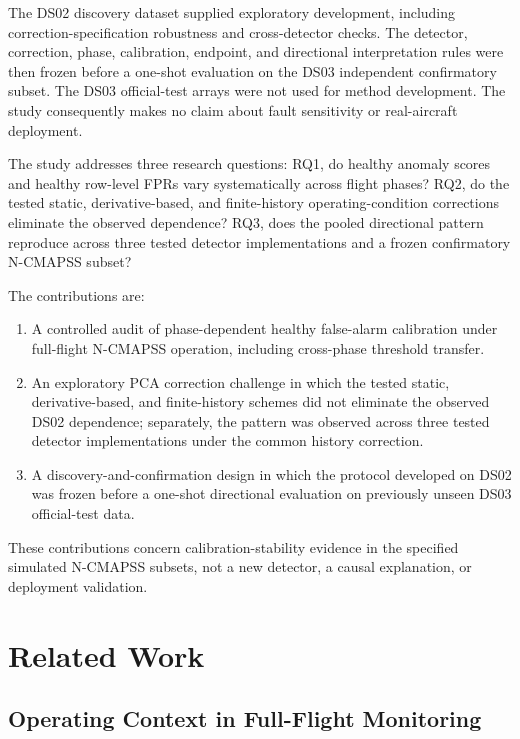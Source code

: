 \documentclass[preprint,12pt]{elsarticle}
\providecommand{\tightlist}{}
\begin{document}
The DS02 discovery dataset supplied exploratory development, including correction-specification robustness and cross-detector checks. The detector, correction, phase, calibration, endpoint, and directional interpretation rules were then frozen before a one-shot evaluation on the DS03 independent confirmatory subset. The DS03 official-test arrays were not used for method development. The study consequently makes no claim about fault sensitivity or real-aircraft deployment.

The study addresses three research questions: RQ1, do healthy anomaly scores and healthy row-level FPRs vary systematically across flight phases? RQ2, do the tested static, derivative-based, and finite-history operating-condition corrections eliminate the observed dependence? RQ3, does the pooled directional pattern reproduce across three tested detector implementations and a frozen confirmatory N-CMAPSS subset?

The contributions are:

\begin{enumerate}
\def\labelenumi{\arabic{enumi}.}
\tightlist
\item
  A controlled audit of phase-dependent healthy false-alarm calibration under full-flight N-CMAPSS operation, including cross-phase threshold transfer.
\item
  An exploratory PCA correction challenge in which the tested static, derivative-based, and finite-history schemes did not eliminate the observed DS02 dependence; separately, the pattern was observed across three tested detector implementations under the common history correction.
\item
  A discovery-and-confirmation design in which the protocol developed on DS02 was frozen before a one-shot directional evaluation on previously unseen DS03 official-test data.
\end{enumerate}

These contributions concern calibration-stability evidence in the specified simulated N-CMAPSS subsets, not a new detector, a causal explanation, or deployment validation.

\section{Related Work}\label{related-work}

\subsection{Operating Context in Full-Flight Monitoring}\label{operating-context-in-full-flight-monitoring}
\end{document}
